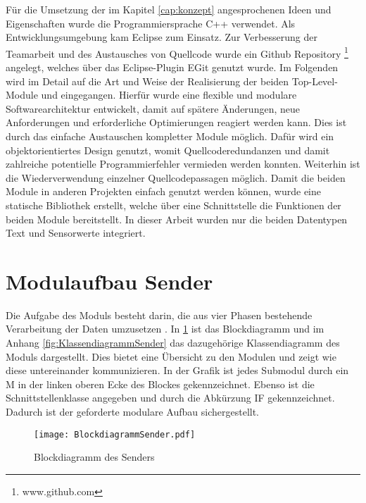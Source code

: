 \label{cap:implementierung}
F{\"u}r die Umsetzung der im Kapitel \ref{cap:konzept} angesprochenen Ideen und
Eigenschaften wurde die Programmiersprache C++ verwendet. Als
Entwicklungsumgebung kam Eclipse zum Einsatz. Zur Verbesserung der Teamarbeit
und des Austausches von Quellcode wurde ein Github Repository
\footnote{www.github.com} angelegt, welches {\"u}ber das Eclipse-Plugin EGit
genutzt wurde. \newline
Im Folgenden wird im Detail auf die Art und Weise der Realisierung der beiden
Top-Level-Module  und  eingegangen. Hierf{\"u}r
wurde eine flexible und modulare Softwarearchitektur entwickelt, damit auf
sp{\"a}tere {\"A}nderungen, neue Anforderungen und erforderliche Optimierungen
reagiert werden kann. Dies ist durch das einfache Austauschen kompletter Module
m{\"o}glich.
Daf{\"u}r wird ein objektorientiertes Design genutzt, womit Quellcoderedundanzen und damit
zahlreiche potentielle Programmierfehler vermieden werden konnten.
Weiterhin ist die Wiederverwendung einzelner Quellcodepassagen m{\"o}glich.\newline
Damit die beiden Module in anderen Projekten einfach genutzt werden k{\"o}nnen,
wurde eine statische Bibliothek erstellt, welche {\"u}ber eine Schnittstelle die
Funktionen der beiden Module bereitstellt. In dieser Arbeit wurden nur die beiden
Datentypen Text und Sensorwerte integriert.

\section{Modulaufbau Sender}
 
Die Aufgabe des Moduls  besteht darin, die aus vier Phasen
bestehende Verarbeitung der Daten umzusetzen \cite{Daher}.
In \ref{fig:BlockdiagrammSender} ist das Blockdiagramm und im Anhang
\ref{fig:KlassendiagrammSender} das dazugehörige Klassendiagramm des Moduls
 dargestellt.
Dies bietet eine {\"U}bersicht zu den Modulen und zeigt wie diese untereinander 
kommunizieren. In der Grafik ist jedes Submodul durch ein M in der linken
oberen Ecke des Blockes gekennzeichnet. Ebenso ist die Schnittstellenklasse
angegeben und durch die Abk{\"u}rzung \gls{IF} gekennzeichnet. Dadurch ist der
geforderte modulare Aufbau sichergestellt.

\begin{figure}[H]
\centering
\texttt{[image: BlockdiagrammSender.pdf]} %
\caption{Blockdiagramm des Senders}
\label{fig:BlockdiagrammSender}
\end{figure}

